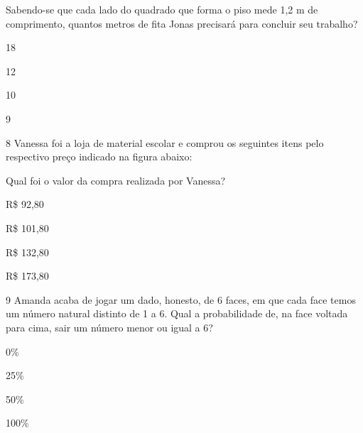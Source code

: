 Sabendo-se que cada lado do quadrado que forma o piso mede 1,2 m de
comprimento, quantos metros de fita Jonas precisará para concluir seu
trabalho?

\begin{escolha}
\item
  18
\item
  12
\item
  10
\item
  9
\end{escolha}


\num{8} Vanessa foi a loja de material escolar e comprou os seguintes itens
pelo respectivo preço indicado na figura abaixo:


Qual foi o valor da compra realizada por Vanessa?

\begin{escolha}
\item
  R\$ 92,80
\item
  R\$ 101,80
\item
  R\$ 132,80
\item
  R\$ 173,80
\end{escolha}


\num{9} Amanda acaba de jogar um dado, honesto, de 6 faces, em que cada
face temos um número natural distinto de 1 a 6. Qual a probabilidade de,
na face voltada para cima, sair um número menor ou igual a 6?

\begin{escolha}
\item
  0\%
\item
  25\%
\item
  50\%
\item
  100\%
\end{escolha}

